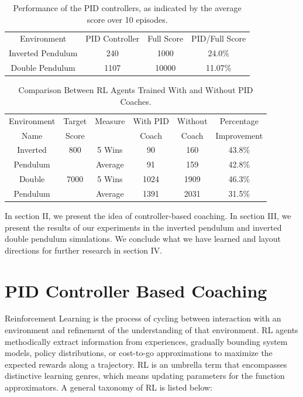 
\begin{table}
\footnotesize
\caption{Performance of the PID controllers, as indicated by the average score over 10 episodes.}
\label{score_compare}
\centering
\begin{tabular}{ cccc }
\rowcolor{airforceblue}
Environment & PID Controller &Full Score &PID\slash Full Score \\
Inverted Pendulum & 240 & 1000& 24.0\%\\
\rowcolor{beaublue}

Double Pendulum & 1107 & 10000& 11.07\%\\
\end{tabular}
\end{table}


\begin{table}
\scriptsize
\caption{Comparison Between RL Agents Trained With and Without PID Coaches.}
\label{episode_compare}
\centering
\begin{tabular}{ cccccc }
\rowcolor{airforceblue}

Environment & Target & Measure & With PID & Without & Percentage\\
\rowcolor{airforceblue}

Name & Score & & Coach & Coach & Improvement \\
Inverted & 800& 5 Wins & 90 & 160& 43.8\% \\
Pendulum & &Average & 91 & 159& 42.8\%\\
\rowcolor{beaublue}
Double & 7000& 5 Wins & 1024 & 1909& 46.3\%\\
\rowcolor{beaublue}
Pendulum & &Average & 1391 & 2031& 31.5\%\\

\end{tabular}
\end{table}

In section II, we present the idea of controller-based coaching. In section III, we present the results of our experiments in the inverted pendulum and inverted double pendulum simulations. We conclude what we have learned and layout directions for further research in section IV.

\section{PID Controller Based Coaching}

Reinforcement Learning is the process of cycling between interaction with an environment and refinement of the understanding of that environment. RL agents methodically extract information from experiences, gradually bounding system models, policy distributions, or cost-to-go approximations to maximize the expected rewards along a trajectory. RL is an umbrella term that encompasses distinctive learning genres, which means updating parameters for the function approximators. A general taxonomy of RL is listed below:

